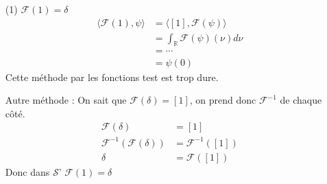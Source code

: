 \documentclass[12pt,a4paper]{report}
\newcommand{\ens}[1]{\ensuremath{\mathbb{#1}}}
\newcommand{\F}{\ensuremath{\mathcal{F}}}
\newcommand{\Sf}{\ensuremath{\mathcal{S}}}
\begin{document}
\begin{itemize}
	\item[(1)] \(\F(1) = \delta\)
	\begin{align*}
		\langle \F(1), \psi \rangle &= \langle [1], \F(\psi) \rangle\\
		&= \int_{\ens{R}} \F(\psi)(\nu) d\nu\\
		&= \cdots\\
		&= \psi(0)
	\end{align*}
	Cette méthode par les fonctions test est trop dure.
	
	Autre méthode : On sait que \(\F(\delta) = [1]\), on prend donc \(\F^{-1}\) de chaque côté.
	\begin{align*}
		\F(\delta) &= [1]\\
		\F^{-1}(\F(\delta)) &= \F^{-1}([1])\\
		\delta &= \F([1])
	\end{align*}
	Donc dans \Sf' \(\F(1) = \delta\)
\end{itemize}
\end{document}
